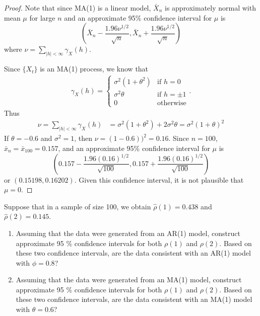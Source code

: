 \documentclass[12pt]{article}
\theoremstyle{definition}
\newenvironment{custompbm}[1]
  {\renewcommand\theproblem{#1}\problem}
  {\endproblem}
\begin{document}
\begin{proof}
  Note that since MA(1) is a linear model, $\bar{X}_{n}$ is approximately normal
  with mean $\mu$ for large $n$ and an approximate 95\% confidence interval for
  $\mu$ is
  \[
    \left(\bar{X}_{n} - \frac{1.96\nu^{1/2}}{\sqrt{n}}, \bar{X}_{n} + \frac{1.96\nu^{1/2}}{\sqrt{n}}\right)
  \]
  where $\nu = \sum_{|h|<\infty}\gamma_X(h)$.

  Since $\{X_t\}$ is an MA(1) process, we know that
  \begin{align*}
    \gamma_X(h) =
    \begin{cases}
      \sigma^2(1+\theta^2) & \text{if $h=0$}\\
      \sigma^2\theta & \text{if $h=\pm 1$}\\
      0 & \text{otherwise}
    \end{cases}.
  \end{align*}
  Thus
  \begin{align*}
    \nu = \sum_{|h| < \infty} \gamma_X(h)
    &= \sigma^2(1+\theta^2) +2\sigma^2\theta = \sigma^2(1+\theta)^2
  \end{align*}
  If $\theta = -0.6$ and $\sigma^2 = 1$, then $\nu = (1 - 0.6))^2 = 0.16$. Since $n=100$,
  $\bar{x}_{n} = \bar{x}_{100} = 0.157$, and an approximate 95\% confidence interval
  for $\mu$ is
  \[
    \left(0.157 - \frac{1.96(0.16)^{1/2}}{\sqrt{100}}, 0.157 + \frac{1.96(0.16)^{1/2}}{\sqrt{100}}\right)
  \]
  or $(0.15198, 0.16202)$. Given this confidence interval, it is not plausible that
  $\mu = 0.$
\end{proof}


\begin{custompbm}{2.13}
  Suppose that in a sample of size 100, we obtain $\hat{\rho}(1) = 0.438$
  and $\hat{\rho}(2) = 0.145$.
  \begin{enumerate}
    \item Assuming that the data were generated from an AR(1) model, construct
      approximate 95 \% confidence intervals for both $\rho(1)$ and $\rho(2)$.
      Based on these two confidence intervals, are the data consistent with an
      AR(1) model with $\phi = 0.8$?
    \item Assuming that the data were generated from an MA(1) model, construct
      approximate 95 \% confidence intervals for both $\rho(1)$ and $\rho(2)$.
      Based on these two confidence intervals, are the data consistent with an
      MA(1) model with $\theta = 0.6$?
  \end{enumerate}
\end{custompbm}
\end{document}
